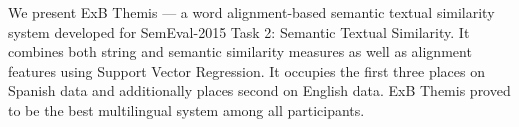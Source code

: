 We present ExB Themis --- a word alignment-based semantic textual similarity system developed for SemEval-2015 Task 2: Semantic Textual Similarity. It combines both string and semantic similarity measures as well as alignment features using Support Vector Regression. It occupies the first three places on Spanish data and additionally places second on English data. ExB Themis proved to be the best multilingual system among all participants.
